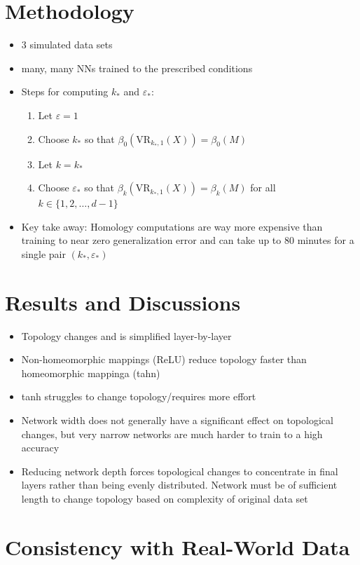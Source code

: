 \documentclass{article}
\newcommand{\VR}{\text{VR}}
\begin{document}
\section*{Methodology}

\begin{itemize}
	\item 3 simulated data sets
	\item many, many NNs trained to the prescribed conditions
	\item Steps for computing $k_*$ and $\varepsilon_*$:
		\begin{enumerate}
			\item[(i)] Let $\varepsilon = 1$
			\item[(ii)] Choose $k_*$ so that $\beta_0(\VR_{k_*, 1}(X)) = \beta_0(M)$
			\item[(iii)] Let $k = k_*$
			\item[(iv)] Choose $\varepsilon_*$ so that $\beta_k(\VR_{k_*, 1}(X)) = \beta_k(M)$ for all $k \in \{1, 2, \dots, d-1\}$
		\end{enumerate}
	\item Key take away: Homology computations are way more expensive than training to near zero generalization error and can take up to 80 minutes for a single pair $(k_*, \varepsilon_*)$
\end{itemize}


\section*{Results and Discussions}
\begin{itemize}
	\item Topology changes and is simplified layer-by-layer
	\item Non-homeomorphic mappings (ReLU) reduce topology faster than homeomorphic mappinga (tahn)
	\item tanh struggles to change topology/requires more effort
	\item Network width does not generally have a significant effect on topological changes, but very narrow networks are much harder to train to a high accuracy
	\item Reducing network depth forces topological changes to concentrate in final layers rather than being evenly distributed. Network must be of sufficient length to change topology based on complexity of original data set
\end{itemize}


\section*{Consistency with Real-World Data}
\end{document}
